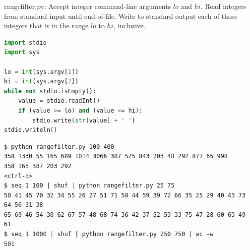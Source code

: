 \documentclass[8pt,a4paper,compress]{beamer}
\begin{document}
\begin{frame}[fragile]
\pause

\begin{framed}
\tiny rangefilter.py: Accept integer command-line arguments $lo$ and $hi$. Read integers from standard input until end-of-file. Write to standard output each of those integers that is in the range $lo$ to $hi$, inclusive.
\end{framed}

\begin{lstlisting}[language=Python]
import stdio
import sys

lo = int(sys.argv[1])
hi = int(sys.argv[2])
while not stdio.isEmpty():
    value = stdio.readInt()
    if (value >= lo) and (value <= hi):
        stdio.write(str(value) + ' ')
stdio.writeln()
\end{lstlisting}

\pause

\begin{lstlisting}[language={}]
$ python rangefilter.py 100 400
358 1330 55 165 689 1014 3066 387 575 843 203 48 292 877 65 998
358 165 387 203 292
<ctrl-d>
$ seq 1 100 | shuf | python rangefilter.py 25 75
50 41 45 70 32 34 55 26 27 51 71 58 44 59 39 72 66 35 25 29 40 43 73 64 56 31 38 
65 69 46 54 30 62 67 57 48 68 74 36 42 37 52 53 33 75 47 28 60 63 49 61 
$ seq 1 1000 | shuf | python rangefilter.py 250 750 | wc -w
501
\end{lstlisting}
\end{frame}
\end{document}
